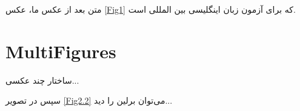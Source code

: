 \documentclass{book}
\begin{document}
متن بعد از عکس ما، عکس \ref{Fig1}
که برای آزمون زبان اینگلیسی بین المللی است.
\\

\section{MultiFigures}
ساختار چند عکسی...
\begin{figure}[h!]
	\begin{center}
	\hspace*{1cm}
	\end{center}

\end{figure}

سپس در تصویر \ref{Fig2.2}
می‌توان برلین را دید...
\end{document}
